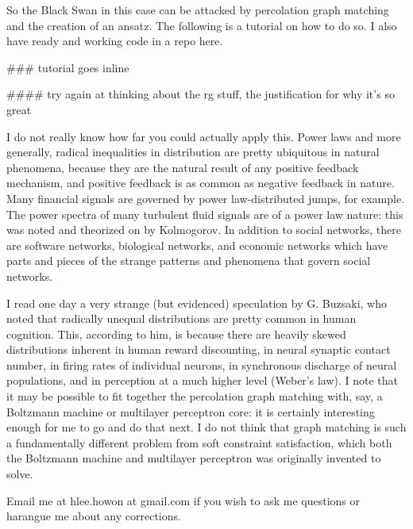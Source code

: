 \documentclass[12pt]{article}
\begin{document}
So the Black Swan in this case can be attacked by percolation graph matching and the creation of an ansatz. The following is a tutorial on how to do so. I also have ready and working code in a repo here.

### tutorial goes inline

#### try again at thinking about the rg stuff, the justification for why it's so great

I do not really know how far you could actually apply this. Power laws and more generally, radical inequalities in distribution are pretty ubiquitous in natural phenomena, because they are the natural result of any positive feedback mechanism, and positive feedback is as common as negative feedback in nature. Many financial signals are governed by power law-distributed jumps, for example. The power spectra of many turbulent fluid signals are of a power law nature: this was noted and theorized on by Kolmogorov. In addition to social networks, there are software networks, biological networks, and economic networks which have parts and pieces of the strange patterns and phenomena that govern social networks.

I read one day a very strange (but evidenced) speculation by G. Buzsaki, who noted that radically unequal distributions are pretty common in human cognition. This, according to him, is because there are heavily skewed distributions inherent in human reward discounting, in neural synaptic contact number, in firing rates of individual neurons, in synchronous discharge of neural populations, and in perception at a much higher level (Weber's law). I note that it may be possible to fit together the percolation graph matching with, say, a Boltzmann machine or multilayer perceptron core: it is certainly interesting enough for me to go and do that next. I do not think that graph matching is such a fundamentally different problem from soft constraint satisfaction, which both the Boltzmann machine and multilayer perceptron was originally invented to solve.

Email me at hlee.howon at gmail.com if you wish to ask me questions or harangue me about any corrections.
\end{document}
